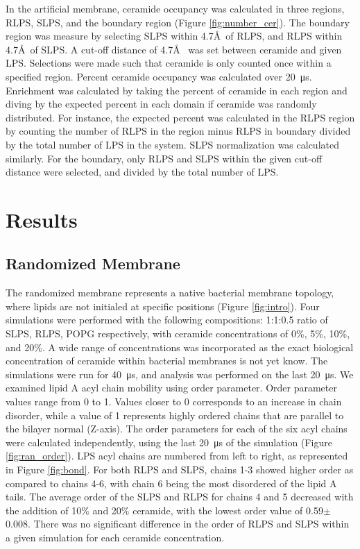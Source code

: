 \documentclass[10pt, letterpaper]{article}
\begin{document}
In the artificial membrane, ceramide occupancy was calculated in three regions, RLPS, SLPS, and the boundary region (Figure \ref{fig:number_cer}). The boundary region was measure by selecting SLPS within 4.7\AA~of RLPS, and RLPS within 4.7\AA~of SLPS. A cut-off distance of 4.7\AA~ was set between ceramide and given LPS. Selections were made such that ceramide is only counted once within a specified region. Percent ceramide occupancy was calculated over \SI{20}{\micro\second}. Enrichment was calculated by taking the percent of ceramide in each region and diving by the expected percent in each domain if ceramide was randomly distributed. For instance, the expected percent was calculated in the RLPS region by counting the number of RLPS in the region minus RLPS in boundary divided by the total number of LPS in the system. SLPS normalization was calculated similarly. For the boundary, only RLPS and SLPS within the given cut-off distance were selected, and divided by the total number of LPS.


\newpage
\section{Results}
\subsection{Randomized Membrane}
\par The randomized membrane represents a native bacterial membrane topology, where lipids are not initialed at specific positions (Figure {\ref{fig:intro}}). Four simulations were performed with the following compositions: 1:1:0.5 ratio of SLPS, RLPS, POPG respectively, with ceramide concentrations of 0\%, 5\%, 10\%, and 20\%. A wide range of concentrations was incorporated as the exact biological concentration of ceramide within bacterial membranes is not yet know. The simulations were run for \SI{40}{\micro\second}, and analysis was performed on the last \SI{20}{\micro\second}. 
We examined lipid A acyl chain mobility using order parameter. Order parameter values range from 0 to 1. Values closer to 0 corresponds to an increase in chain disorder, while a value of 1 represents highly ordered chains that are parallel to the bilayer normal (Z-axis). The order parameters for each of the six acyl chains were calculated independently, using the last \SI{20}{\micro\second} of the simulation (Figure \ref{fig:ran_order}). 
LPS acyl chains are numbered from left to right, as represented in Figure \ref{fig:bond}. For both RLPS and SLPS, chains 1-3 showed higher order as compared to chains 4-6, with chain 6 being the most disordered of the lipid A tails. The average order of the SLPS and RLPS for chains 4 and 5 decreased with the addition of 10\% and 20\% ceramide, with the lowest order value of 0.59$\pm$ 0.008. There was no significant difference in the order of RLPS and SLPS within a given simulation for each ceramide concentration. 
\end{document}
